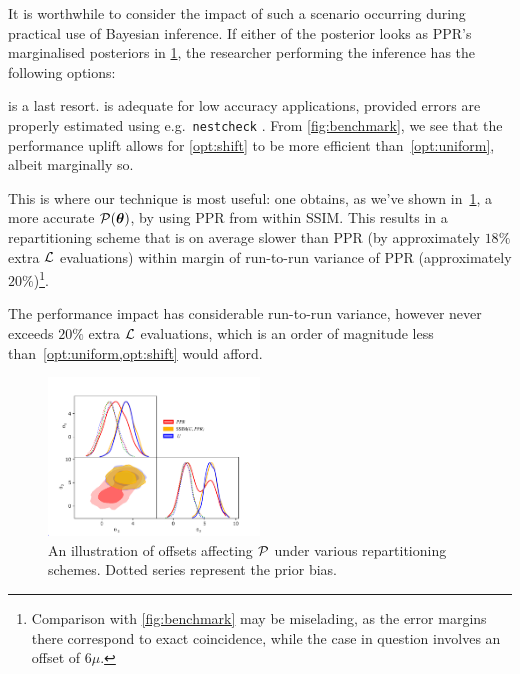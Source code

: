 \documentclass[usenatbib]{mnras}
\begin{document}
It is worthwhile to consider the impact of such a scenario occurring
during practical use of Bayesian inference. If either of the posterior
looks as PPR's marginalised posteriors in \cref{fig:convergence}, the
researcher performing the inference has the following options:
 is a last resort.  is
adequate for low accuracy applications, provided errors are properly
estimated using e.g.~\texttt{nestcheck} \cite{higson2018nestcheck}.
From \cref{fig:benchmark}, we see that the performance uplift allows
for \cref{opt:shift} to be more efficient than~\ref{opt:uniform},
albeit marginally so.

This is where our technique is most useful: one obtains, as we've
shown in~\cref{fig:convergence}, a more accurate
\({\cal P}(\bm{\theta})\), by using PPR from within SSIM. This results
in a repartitioning scheme that is on average slower than PPR (by
approximately \(18\%\) extra \({\cal L}\) evaluations) within margin
of run-to-run variance of PPR (approximately
\(20\%\))\footnote{Comparison with \cref{fig:benchmark} may be
  miselading, as the error margins there correspond to exact
  coincidence, while the case in question involves an offset of
  $6\mu$. }.

The
performance impact has considerable run-to-run variance, however never
exceeds \(20\%\) extra \({\cal L}\) evaluations, which is an order of
magnitude less than~\vref{opt:uniform,opt:shift} would afford.

\begin{figure}
\includegraphics[width=0.5\textwidth]{./illustrations/convergence.pdf}
\caption{An illustration of offsets affecting ${\cal P}$ under various
  repartitioning schemes. Dotted series represent the prior
  bias. \label{fig:convergence}}
\end{figure}
\end{document}
